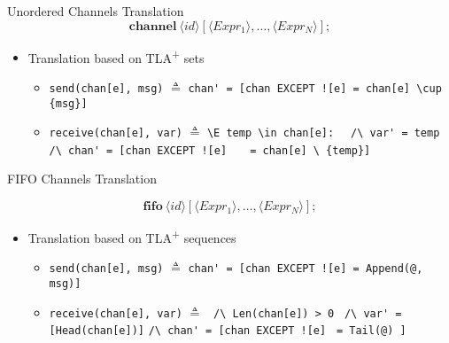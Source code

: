\documentclass{beamer}
\newcommand\tab[1][1cm]{\hspace*{#1}}
\newcommand{\tlaplus}{TLA\textsuperscript{+}\xspace}
\newcommand{\keyword}[1]{\textbf{#1}}
\newcommand{\entity}[1]{\ensuremath{\langle}#1\ensuremath{\rangle}}
\begin{document}
\begin{frame}[fragile]{Unordered Channels Translation}
        \[
            \keyword{channel}\ \entity{id}[\entity{Expr_1},\dots,\entity{Expr_N}];
        \]
    \begin{itemize}

     \item Translation based on \tlaplus sets
     \newline
        \begin{itemize}
            \item \verb|send(chan[e], msg)| $\triangleq$
            \verb|chan' = [chan EXCEPT ![e] = chan[e] \cup {msg}]| 
            \newline
            \item \verb|receive(chan[e], var)| $\triangleq$
                  \verb|\E temp \in chan[e]:| \newline \tab\tab\tab\tab
                     \verb|  /\ var' = temp|\newline \tab\tab\tab\tab
                     \verb|  /\ chan' = [chan EXCEPT ![e]|
                     \tab\tab\tab\tab\tab\tab\verb|   = chan[e] \ {temp}]|
        \end{itemize}

    \end{itemize}
\end{frame}

\begin{frame}[fragile]{FIFO Channels Translation}

        \[
            \keyword{fifo}\ \entity{id}[\entity{Expr_1},\dots,\entity{Expr_N}];
        \]
    \begin{itemize}    
     \item Translation based on \tlaplus sequences
     \newline
            \begin{itemize}
                \item \verb|send(chan[e], msg)| $\triangleq$
                \verb|chan' = [chan EXCEPT ![e] = Append(@, msg)]| 
                \newline
                \item \verb|receive(chan[e], var)| $\triangleq$
                      \verb| /\ Len(chan[e]) > 0 | \newline \tab\tab\tab\tab
                         \verb|/\ var' = [Head(chan[e])]|\newline \tab\tab\tab\tab
                         \verb|/\ chan' = [chan EXCEPT ![e]|
                         \tab\tab\tab\tab\tab\tab\verb| = Tail(@) ]|
            \end{itemize}
    \end{itemize}
\end{frame}
\end{document}
